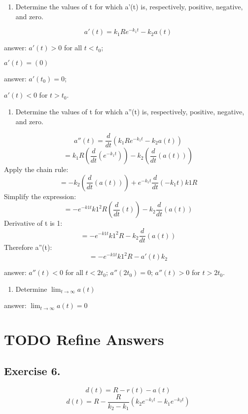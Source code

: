 \documentclass[]{article}
\providecommand{\tightlist}{%
  \setlength{\itemsep}{0pt}\setlength{\parskip}{0pt}}
\begin{document}
\begin{enumerate}
\def\labelenumi{(\alph{enumi})}
\tightlist
\item
  Determine the values of t for which a'(t) is, respectively, positive,
  negative, and zero.
\end{enumerate}

\[a'(t) =k_1Re^{-k_1t}-k_2a(t)\]

answer: \(a'(t) > 0\) for all \(t < t_0\);

\(a'(t) = (0)\)

answer: \(a'(t_0) = 0\);

\(a'(t) < 0\) for \(t > t_0\).

\begin{enumerate}
\def\labelenumi{(\alph{enumi})}
\setcounter{enumi}{1}
\tightlist
\item
  Determine the values of t for which a''(t) is, respectively, positive,
  negative, and zero.
\end{enumerate}

\[a''(t) = \frac{d}{dt}(k_1Re^{-k_1t}-k_2a(t))\]
\[=k_1 R(\frac{d}{dt}(e^{-k_1 t}))- k_2 (\frac{d}{dt}(a(t)))\] Apply the
chain rule:
\[=- k_2 (\frac{d}{dt}(a(t)))+ e^{-k_1 t}\frac{d}{dt}({-k_1 t})k1 R\]
Simplify the expression:
\[=-e^{-k1 t}k1^2 R(\frac{d}{dt}(t)) -k_2 \frac{d}{dt}({a(t)})\]
Derivative of t is 1: \[=-e^{-k1 t}k1^2 R-k_2 \frac{d}{dt}({a(t)})\]
Therefore a''(t): \[=-e^{-k1 t}k1^2 R-a'(t)k_2\]

answer: \(a''(t) < 0\) for all \(t < 2t_0\); \(a''(2t_0) =0\);
\(a''(t) > 0\) for \(t > 2t_0\).

\begin{enumerate}
\def\labelenumi{(\alph{enumi})}
\setcounter{enumi}{2}
\tightlist
\item
  Determine \(\lim_{t\to\infty}a(t)\)
\end{enumerate}

answer: \(\lim_{t\to\infty}a(t) =0\)

\section{TODO Refine Answers}\label{todo-refine-answers}

\subsection{Exercise 6.}\label{exercise-6.}

\[d(t) = R - r(t) - a(t)\]
\[d(t) = R - \frac{R}{k_2 - k_1}(k_2 e ^{-k_1 t} - k_1 e^{-k_2 t})\]
\end{document}
